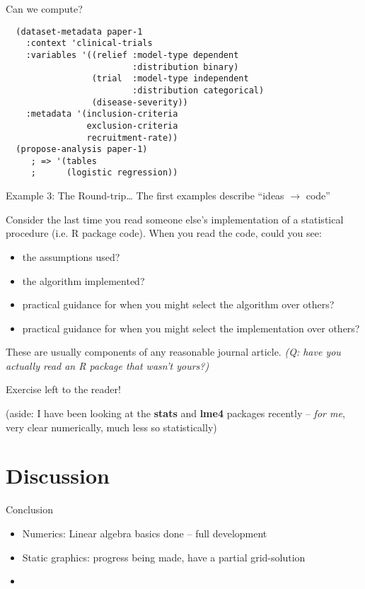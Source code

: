 \documentclass{beamer}
\begin{document}
\begin{frame}[fragile]{Can we compute?}
\begin{verbatim}
  (dataset-metadata paper-1
    :context 'clinical-trials
    :variables '((relief :model-type dependent
                         :distribution binary)
                 (trial  :model-type independent
                         :distribution categorical)
                 (disease-severity))
    :metadata '(inclusion-criteria
                exclusion-criteria
                recruitment-rate))
  (propose-analysis paper-1)
     ; => '(tables
     ;      (logistic regression))
\end{verbatim}
\end{frame}

\begin{frame}{Example 3: The Round-trip\ldots} 
  \label{example3}
  The first examples describe ``ideas $\rightarrow$ code''

  Consider the last time you read someone else's implementation of a
  statistical procedure (i.e. R package code).  When you read the
  code, could you see:
  \begin{itemize}
  \item the assumptions used?
  \item the algorithm implemented?
  \item practical guidance for when you might select the algorithm
    over others? 
  \item practical guidance for when you might select the
    implementation over others? 
  \end{itemize}
  These are usually components of any reasonable journal article.
  \textit{(Q: have you actually read an R package that wasn't yours?)}
\end{frame}

\begin{frame}{Exercise left to the reader!}

  (aside: I have been looking at the \textbf{stats} and \textbf{lme4}
  packages recently -- \textit{for me}, very clear numerically, much
  less so statistically)
\end{frame}



\section{Discussion}

\begin{frame}{Conclusion}
  \begin{itemize}
  \item Numerics: Linear algebra basics done -- full development
  \item Static graphics: progress being made, have a partial grid-solution
  \item 
  \end{itemize}
\end{frame}
\end{document}

